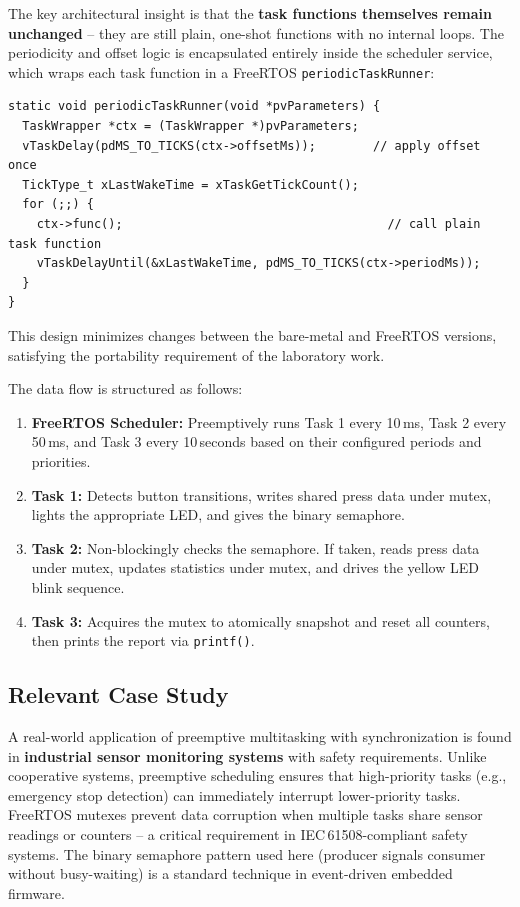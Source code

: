 The key architectural insight is that the \textbf{task functions themselves remain unchanged} -- they
are still plain, one-shot functions with no internal loops. The periodicity and offset logic is
encapsulated entirely inside the scheduler service, which wraps each task function in a FreeRTOS
\texttt{periodicTaskRunner}:

\begin{lstlisting}
static void periodicTaskRunner(void *pvParameters) {
  TaskWrapper *ctx = (TaskWrapper *)pvParameters;
  vTaskDelay(pdMS_TO_TICKS(ctx->offsetMs));        // apply offset once
  TickType_t xLastWakeTime = xTaskGetTickCount();
  for (;;) {
    ctx->func();                                     // call plain task function
    vTaskDelayUntil(&xLastWakeTime, pdMS_TO_TICKS(ctx->periodMs));
  }
}
\end{lstlisting}

This design minimizes changes between the bare-metal and FreeRTOS versions, satisfying the
portability requirement of the laboratory work.

The data flow is structured as follows:
\begin{enumerate}
  \item \textbf{FreeRTOS Scheduler:} Preemptively runs Task 1 every 10\,ms, Task 2 every 50\,ms,
    and Task 3 every 10\,seconds based on their configured periods and priorities.
  \item \textbf{Task 1:} Detects button transitions, writes shared press data under mutex, lights
    the appropriate LED, and gives the binary semaphore.
  \item \textbf{Task 2:} Non-blockingly checks the semaphore. If taken, reads press data under mutex,
    updates statistics under mutex, and drives the yellow LED blink sequence.
  \item \textbf{Task 3:} Acquires the mutex to atomically snapshot and reset all counters, then prints
    the report via \texttt{printf()}.
\end{enumerate}

\subsection{Relevant Case Study}
A real-world application of preemptive multitasking with synchronization is found in
\textbf{industrial sensor monitoring systems} with safety requirements. Unlike cooperative systems,
preemptive scheduling ensures that high-priority tasks (e.g., emergency stop detection) can
immediately interrupt lower-priority tasks. FreeRTOS mutexes prevent data corruption when multiple
tasks share sensor readings or counters -- a critical requirement in IEC\,61508-compliant safety
systems. The binary semaphore pattern used here (producer signals consumer without busy-waiting)
is a standard technique in event-driven embedded firmware.
